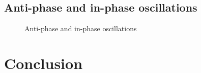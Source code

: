 \documentclass[12pt,twoside]{article}
\theoremstyle{plain}
\theoremstyle{definition}
\theoremstyle{remark}
\begin{document}
\subsection{Anti-phase and in-phase oscillations}

\begin{figure}[htbp]
\centering     %
{}
\caption{Anti-phase and in-phase oscillations}
\label{fig:in-anti-phase}
\end{figure}



\section{Conclusion}

\cite{ronsse2009computational, williamson1998neural, matsuoka1987mechanisms, matsuoka1985sustained}

%
%


\end{document}

